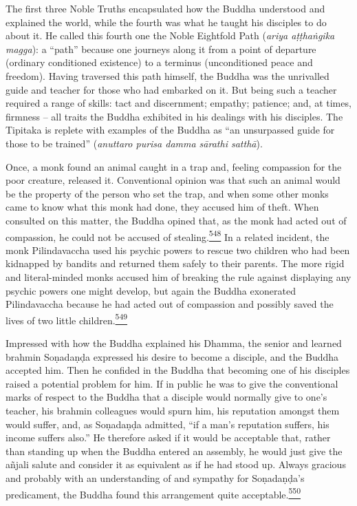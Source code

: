 The first three Noble Truths encapsulated how the Buddha understood and
explained the world, while the fourth was what he taught his disciples
to do about it. He called this fourth one the Noble Eightfold Path
(\emph{ariya aṭṭhaṅgika magga}): a ``path'' because one journeys along
it from a point of departure (ordinary conditioned existence) to a
terminus (unconditioned peace and freedom). Having traversed this path
himself, the Buddha was the unrivalled guide and teacher for those who
had embarked on it. But being such a teacher required a range of skills:
tact and discernment; empathy; patience; and, at times, firmness -- all
traits the Buddha exhibited in his dealings with his disciples. The
Tipitaka is replete with examples of the Buddha as ``an unsurpassed
guide for those to be trained'' (\emph{anuttaro purisa damma sārathi
satthā}).

Once, a monk found an animal caught in a trap and, feeling compassion
for the poor creature, released it. Conventional opinion was that such
an animal would be the property of the person who set the trap, and when
some other monks came to know what this monk had done, they accused him
of theft. When consulted on this matter, the Buddha opined that, as the
monk had acted out of compassion, he could not be accused of
stealing.\label{footprints_split_014.html_fnref548}\hyperref[footprints_split_025.htmlux5cux23fn548]{\textsuperscript{548}}
In a related incident, the monk Pilindavaccha used his psychic powers to
rescue two children who had been kidnapped by bandits and returned them
safely to their parents. The more rigid and literal-minded monks accused
him of breaking the rule against displaying any psychic powers one might
develop, but again the Buddha exonerated Pilindavaccha because he had
acted out of compassion and possibly saved the lives of two little
children.\label{footprints_split_014.html_fnref549}\hyperref[footprints_split_025.htmlux5cux23fn549]{\textsuperscript{549}}

Impressed with how the Buddha explained his Dhamma, the senior and
learned brahmin Soṇadaṇḍa expressed his desire to become a disciple, and
the Buddha accepted him. Then he confided in the Buddha that becoming
one of his disciples raised a potential problem for him. If in public he
was to give the conventional marks of respect to the Buddha that a
disciple would normally give to one's teacher, his brahmin colleagues
would spurn him, his reputation amongst them would suffer, and, as
Soṇadaṇḍa admitted, ``if a man's reputation suffers, his income suffers
also.'' He therefore asked if it would be acceptable that, rather than
standing up when the Buddha entered an assembly, he would just give the
añjali salute and consider it as equivalent as if he had stood up.
Always gracious and probably with an understanding of and sympathy for
Soṇadaṇḍa's predicament, the Buddha found this arrangement quite
acceptable.\label{footprints_split_014.html_fnref550}\hyperref[footprints_split_025.htmlux5cux23fn550]{\textsuperscript{550}}


